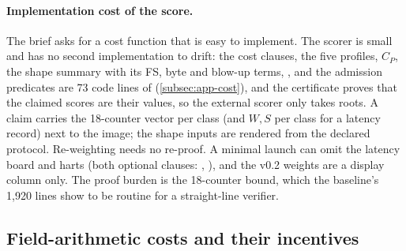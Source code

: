 \paragraph{Implementation cost of the score.} The brief asks for a cost function that is easy to
implement. The scorer is small and has no second implementation to drift: the cost clauses, the five
profiles, $C_P$, the shape summary with its FS, byte and blow-up terms, ,
 and the admission predicates are 73 code lines of 
(\cref{subsec:app-cost}), and the certificate proves that the claimed scores are their values, so
the external scorer only takes roots. A claim carries the 18-counter vector per class (and $W,S$ per
class for a latency record) next to the image; the shape inputs are rendered from the declared
protocol. Re-weighting needs no re-proof. A minimal launch can omit
the latency board and harts (both optional clauses: , ), and the
v0.2 weights are a display column only. The proof burden is the 18-counter bound, which the
baseline's 1{,}920 lines show to be routine for a straight-line verifier.

\subsection{Field-arithmetic costs and their incentives}\label{subsec:cost-field}


